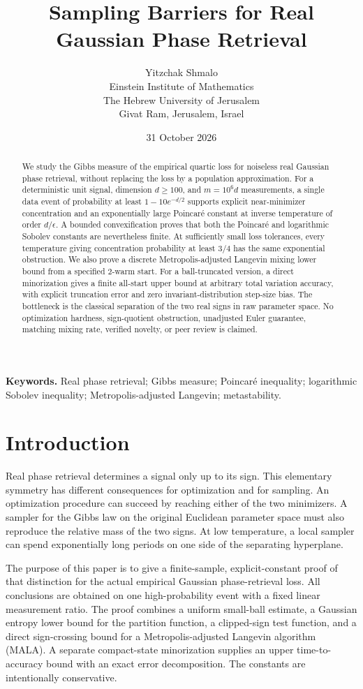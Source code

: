 \documentclass[11pt,letterpaper]{article}
\title{Sampling Barriers for Real Gaussian Phase Retrieval}
\author{Yitzchak Shmalo\\[4pt]
\small Einstein Institute of Mathematics\\
\small The Hebrew University of Jerusalem\\
\small Givat Ram, Jerusalem, Israel}
\date{31 October 2026}
\numberwithin{equation}{section}
\theoremstyle{remark}
\newcommand{\1}{\mathbf 1}
\begin{document}
\maketitle
\begin{abstract}
We study the Gibbs measure of the empirical quartic loss for noiseless real Gaussian phase retrieval, without replacing the loss by a population approximation. For a deterministic unit signal, dimension $d\ge100$, and $m=10^6d$ measurements, a single data event of probability at least $1-10e^{-d/2}$ supports explicit near-minimizer concentration and an exponentially large Poincar\'e constant at inverse temperature of order $d/\epsilon$. A bounded convexification proves that both the Poincar\'e and logarithmic Sobolev constants are nevertheless finite. At sufficiently small loss tolerances, every temperature giving concentration probability at least $3/4$ has the same exponential obstruction. We also prove a discrete Metropolis-adjusted Langevin mixing lower bound from a specified $2$-warm start. For a ball-truncated version, a direct minorization gives a finite all-start upper bound at arbitrary total variation accuracy, with explicit truncation error and zero invariant-distribution step-size bias. The bottleneck is the classical separation of the two real signs in raw parameter space. No optimization hardness, sign-quotient obstruction, unadjusted Euler guarantee, matching mixing rate, verified novelty, or peer review is claimed.
\end{abstract}
\noindent\textbf{Keywords.} Real phase retrieval; Gibbs measure; Poincar\'e inequality; logarithmic Sobolev inequality; Metropolis-adjusted Langevin; metastability.

\section{Introduction}

Real phase retrieval determines a signal only up to its sign. This elementary symmetry has different consequences for optimization and for sampling. An optimization procedure can succeed by reaching either of the two minimizers. A sampler for the Gibbs law on the original Euclidean parameter space must also reproduce the relative mass of the two signs. At low temperature, a local sampler can spend exponentially long periods on one side of the separating hyperplane.

The purpose of this paper is to give a finite-sample, explicit-constant proof of that distinction for the actual empirical Gaussian phase-retrieval loss. All conclusions are obtained on one high-probability event with a fixed linear measurement ratio. The proof combines a uniform small-ball estimate, a Gaussian entropy lower bound for the partition function, a clipped-sign test function, and a direct sign-crossing bound for a Metropolis-adjusted Langevin algorithm (MALA). A separate compact-state minorization supplies an upper time-to-accuracy bound with an exact error decomposition. The constants are intentionally conservative.
\end{document}
